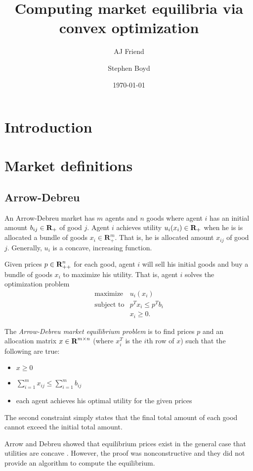 \documentclass{article}
\title{Computing market equilibria via convex optimization}
\author{AJ Friend \and Stephen Boyd}
\date{\today}
\begin{document}
\maketitle

\section{Introduction}

\section{Market definitions}
\subsection{Arrow-Debreu}

An Arrow-Debreu market has $m$ agents and $n$ goods where
agent $i$ has an initial amount $b_{ij} \in {\mbox{\bf R}}_+$ of good $j$.
Agent $i$ achieves utility $u_i(x_i) \in {\mbox{\bf R}}_+$ when he is is allocated a bundle of goods $x_i \in \mathbf{R}^m_{+}$. That is, he is allocated amount $x_{ij}$ of good $j$.
Generally, $u_i$ is a concave, increasing function.

Given prices $p \in {\mbox{\bf R}}^n_{++}$ for each good, agent $i$ will sell his initial goods and buy a bundle of goods $x_i$ to maximize his utility. That is, agent $i$ solves the optimization problem
\[
\begin{array}{ll}
\mbox{maximize} & u_i(x_i) \\
\mbox{subject to} & p^T x_i \leq p^T b_i \\
& x_i \geq 0.
\end{array}
\]

The \emph{Arrow-Debreu market equilibrium problem} is to find prices $p$ and an allocation matrix $x \in {\mbox{\bf R}}^{m \times n}$ (where $x_i^T$ is the $i$th row of $x$) such that the following are true:
\begin{itemize}
\item $x \geq 0$
\item $\sum_{i=1}^m x_{ij} \leq \sum_{i=1}^m b_{ij}$
\item each agent achieves his optimal utility for the given prices
\end{itemize}

The second constraint simply states that the final total amount of each good cannot exceed the initial total amount.

Arrow and Debreu showed that equilibrium prices exist in the general case that
utilities are concave \cite{arrow1954existence}. However, the proof was nonconstructive and they did not provide an algorithm to compute the equilibrium.
\end{document}
